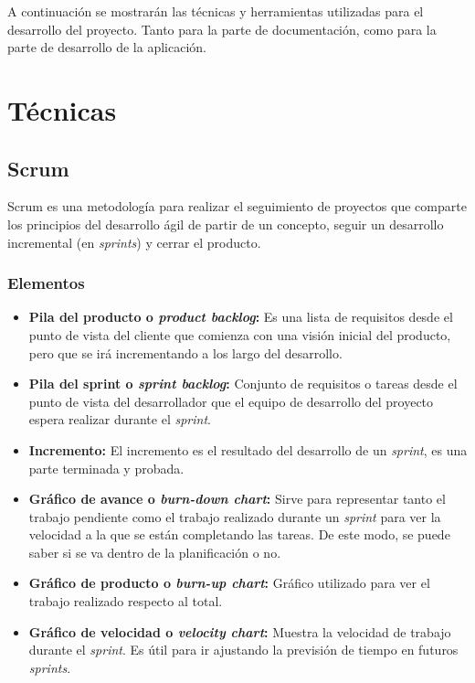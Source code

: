 
A continuación se mostrarán las técnicas y herramientas utilizadas para el desarrollo del proyecto. 
Tanto para la parte de documentación, como para la parte de desarrollo de la aplicación. 

\section{Técnicas}
\subsection{Scrum}
Scrum es una metodología para realizar el seguimiento de proyectos que comparte los principios del desarrollo ágil de partir de un concepto, seguir un desarrollo incremental (en \textit{sprints}) y cerrar el producto.

\subsubsection{Elementos}
\begin{itemize}
\item \textbf{Pila del producto o \textit{product backlog}:}
Es una lista de requisitos desde el punto de vista del cliente que comienza con una visión inicial del producto, pero que se irá incrementando a los largo del desarrollo.

\item \textbf{Pila del sprint o \textit{sprint backlog}:}
Conjunto de requisitos o tareas desde el punto de vista del desarrollador que el equipo de desarrollo del proyecto espera realizar durante el \textit{sprint}.

\item \textbf{Incremento:}
El incremento es el resultado del desarrollo de un \textit{sprint}, es una parte terminada y probada. 

\item \textbf{Gráfico de avance o \textit{burn-down chart}:}
Sirve para representar tanto el trabajo pendiente como el trabajo realizado durante un \textit{sprint} para ver la velocidad a la que se están completando las tareas. De este modo, se puede saber si se va dentro de la planificación o no.

\item \textbf{Gráfico de producto o \textit{burn-up chart}:}
Gráfico utilizado para ver el trabajo realizado respecto al total.

\item \textbf{Gráfico de velocidad o \textit{velocity chart}:}
Muestra la velocidad de trabajo durante el \textit{sprint}. Es útil para ir ajustando la previsión de tiempo en futuros \textit{sprints}.
\end{itemize}

